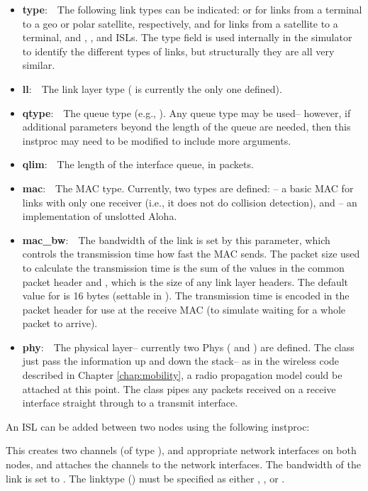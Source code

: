 \begin{itemize} 
	\item {\bf type}:~~The following link types can be indicated:  
 or 
 for links from a terminal to a geo or polar satellite, 
respectively,  and  for links from a satellite
to a terminal, and , , and 
ISLs.  The type field is used internally in the simulator to identify the
different types of links, but structurally they are all very similar.
	\item {\bf ll}:~~The link layer type ( is currently
the only one defined).  
	\item {\bf qtype}:~~The queue type (e.g., ).
Any queue type may be used-- however, if additional parameters beyond the
length of the queue are needed, then this instproc may need to be modified
to include more arguments.
	\item {\bf qlim}:~~The length of the interface queue, in packets.
	\item {\bf mac}:~~The MAC type.  Currently, two types are defined:
-- a basic MAC for links with only one receiver (i.e.,
it does not do collision detection), and
-- an implementation of unslotted Aloha.
	\item {\bf mac\_bw}:~~The bandwidth of the link is set by this 
parameter, which controls the transmission time how fast the MAC sends. The
packet size used to calculate the transmission time is the sum of the
values  in the common packet header and ,
which is the size of any link layer headers.  The default value for
 is 16 bytes (settable in ).
The transmission time is encoded in the packet header for use at the
receive MAC (to simulate waiting for a whole packet to arrive).  
	\item {\bf phy}:~~The physical layer-- currently two Phys 
( and ) are defined.  
The class  just pass the information up and down the stack--
as in the wireless code described in Chapter \ref{chap:mobility}, 
a radio propagation model could be attached at this point.  The class
 pipes any packets received on a receive interface
straight through to a transmit interface.
\end{itemize}

An ISL can be added between two nodes using the following instproc:
This creates two channels (of type ), and appropriate
network interfaces on both nodes, and attaches the channels to the 
network interfaces.  The bandwidth of the link is
set to .  The linktype ()
must be specified as either , , or 
.



